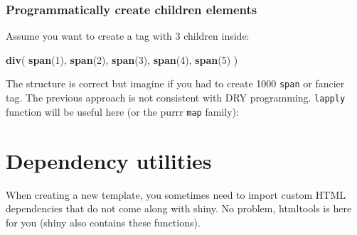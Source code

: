 \documentclass[]{book}
\newenvironment{Shaded}{\begin{snugshade}}{\end{snugshade}}
\newcommand{\CommentTok}[1]{\textcolor[rgb]{0.56,0.35,0.01}{\textit{#1}}}
\newcommand{\ControlFlowTok}[1]{\textcolor[rgb]{0.13,0.29,0.53}{\textbf{#1}}}
\newcommand{\DecValTok}[1]{\textcolor[rgb]{0.00,0.00,0.81}{#1}}
\newcommand{\KeywordTok}[1]{\textcolor[rgb]{0.13,0.29,0.53}{\textbf{#1}}}
\newcommand{\NormalTok}[1]{#1}
\newcommand{\OperatorTok}[1]{\textcolor[rgb]{0.81,0.36,0.00}{\textbf{#1}}}
\newcommand{\StringTok}[1]{\textcolor[rgb]{0.31,0.60,0.02}{#1}}
\begin{document}
\hypertarget{programmatically-create-children-elements}{%
\subsection{Programmatically create children elements}\label{programmatically-create-children-elements}}

Assume you want to create a tag with 3 children inside:

\begin{Shaded}
\begin{Highlighting}[]
\KeywordTok{div}\NormalTok{(}
  \KeywordTok{span}\NormalTok{(}\DecValTok{1}\NormalTok{),}
  \KeywordTok{span}\NormalTok{(}\DecValTok{2}\NormalTok{),}
  \KeywordTok{span}\NormalTok{(}\DecValTok{3}\NormalTok{),}
  \KeywordTok{span}\NormalTok{(}\DecValTok{4}\NormalTok{),}
  \KeywordTok{span}\NormalTok{(}\DecValTok{5}\NormalTok{)}
\NormalTok{)}
\end{Highlighting}
\end{Shaded}

The structure is correct but imagine if you had to create 1000 \texttt{span} or fancier tag. The previous approach is not consistent with DRY programming. \texttt{lapply} function will be useful here (or the purrr \texttt{map} family):

\begin{Shaded}
\end{Shaded}

\hypertarget{htmltools-dependencies}{%
\chapter{Dependency utilities}\label{htmltools-dependencies}}

When creating a new template, you sometimes need to import custom HTML dependencies
that do not come along with shiny. No problem, htmltools is here for you (shiny also
contains these functions).
\end{document}
